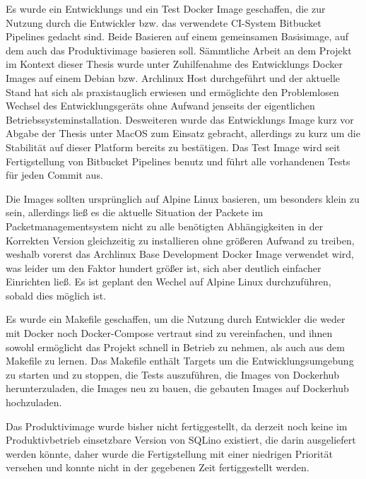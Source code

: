 Es wurde ein Entwicklungs und ein Test Docker Image geschaffen, die zur Nutzung
durch die Entwickler bzw. das verwendete CI-System Bitbucket Pipelines gedacht
sind. Beide Basieren auf einem gemeinsamen Basisimage, auf dem auch das
Produktivimage basieren soll. Sämmtliche Arbeit an dem Projekt im Kontext dieser
Thesis wurde unter Zuhilfenahme des Entwicklungs Docker Images auf einem Debian
bzw. Archlinux Host durchgeführt und der aktuelle Stand hat sich als
praxistauglich erwiesen und ermöglichte den Problemlosen Wechsel des
Entwicklungsgeräts ohne Aufwand jenseits der eigentlichen
Betriebssysteminstallation. Desweiteren wurde das Entwicklungs Image kurz vor
Abgabe der Thesis unter MacOS zum Einsatz gebracht, allerdings zu kurz um die
Stabilität auf dieser Platform bereits zu bestätigen. Das Test Image wird seit
Fertigstellung von Bitbucket Pipelines benutz und führt alle vorhandenen Tests
für jeden Commit aus.

Die Images sollten ursprünglich auf Alpine Linux basieren, um besonders klein zu
sein, allerdings ließ es die aktuelle Situation der Packete im
Packetmanagementsystem nicht zu alle benötigten Abhängigkeiten in der Korrekten
Version gleichzeitig zu installieren ohne größeren Aufwand zu treiben, weshalb
vorerst das Archlinux Base Development Docker Image verwendet wird, was leider
um den Faktor hundert größer ist, sich aber deutlich einfacher Einrichten ließ.
Es ist geplant den Wechel auf Alpine Linux durchzuführen, sobald dies möglich ist.

Es wurde ein Makefile geschaffen, um die Nutzung durch Entwickler die weder mit
Docker noch Docker-Compose vertraut sind zu vereinfachen, und ihnen sowohl
ermöglicht das Projekt schnell in Betrieb zu nehmen, als auch aus dem Makefile
zu lernen. Das Makefile enthält Targets um die Entwicklungsumgebung zu starten
und zu stoppen, die Tests auszuführen, die Images von Dockerhub herunterzuladen,
die Images neu zu bauen, die gebauten Images auf Dockerhub hochzuladen.

Das Produktivimage wurde bisher nicht fertiggestellt, da derzeit noch keine im
Produktivbetrieb einsetzbare Version von SQLino existiert, die darin
ausgeliefert werden könnte, daher wurde die Fertigstellung mit einer niedrigen
Priorität versehen und konnte nicht in der gegebenen Zeit fertiggestellt werden.

